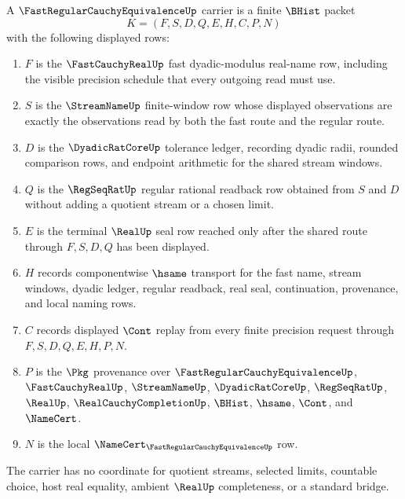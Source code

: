\begin{definition}
\label{def:fast-cauchy-regular-equivalence-carrier}
A $\FastRegularCauchyEquivalenceUp$ carrier is a finite $\BHist$ packet
$$
K=(F,S,D,Q,E,H,C,P,N)
$$
with the following displayed rows:
\begin{enumerate}
\item $F$ is the $\FastCauchyRealUp$ fast dyadic-modulus real-name row, including the visible precision schedule that every outgoing read must use.
\item $S$ is the $\StreamNameUp$ finite-window row whose displayed observations are exactly the observations read by both the fast route and the regular route.
\item $D$ is the $\DyadicRatCoreUp$ tolerance ledger, recording dyadic radii, rounded comparison rows, and endpoint arithmetic for the shared stream windows.
\item $Q$ is the $\RegSeqRatUp$ regular rational readback row obtained from $S$ and $D$ without adding a quotient stream or a chosen limit.
\item $E$ is the terminal $\RealUp$ seal row reached only after the shared route through $F,S,D,Q$ has been displayed.
\item $H$ records componentwise $\hsame$ transport for the fast name, stream windows, dyadic ledger, regular readback, real seal, continuation, provenance, and local naming rows.
\item $C$ records displayed $\Cont$ replay from every finite precision request through $F,S,D,Q,E,H,P,N$.
\item $P$ is the $\Pkg$ provenance over $\FastRegularCauchyEquivalenceUp$, $\FastCauchyRealUp$, $\StreamNameUp$, $\DyadicRatCoreUp$, $\RegSeqRatUp$, $\RealUp$, $\RealCauchyCompletionUp$, $\BHist$, $\hsame$, $\Cont$, and $\NameCert$.
\item $N$ is the local $\NameCert_{\FastRegularCauchyEquivalenceUp}$ row.
\end{enumerate}
The carrier has no coordinate for quotient streams, selected limits, countable choice, host real equality, ambient $\RealUp$ completeness, or a standard bridge.
\end{definition}

